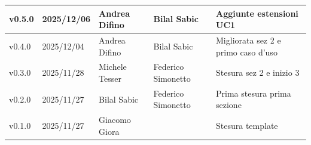 ﻿\documentclass[a4paper,12pt]{article}
\begin{document}
\begin{center}
\begin{tabularx}{\textwidth}{|l|l|l|X|X|}
        v0.5.0             & 2025/12/06          & Andrea Difino        & Bilal Sabic           & Aggiunte estensioni UC1                                     \\
        \hline
        v0.4.0             & 2025/12/04          & Andrea Difino        & Bilal Sabic           & Migliorata sez 2 e primo caso d'uso                         \\
        \hline
        v0.3.0             & 2025/11/28          & Michele Tesser       & Federico Simonetto    & Stesura sez 2 e inizio 3                                    \\
        \hline
        v0.2.0             & 2025/11/27          & Bilal Sabic          & Federico Simonetto    & Prima stesura prima sezione                                 \\
        \hline
        v0.1.0             & 2025/11/27          & Giacomo Giora        &                       & Stesura template                                            \\
        \hline
    \end{tabularx}
\end{center}

\newpage

\tableofcontents

\newpage

\listoffigures

\newpage

\listoftables

\newpage
\end{document}
